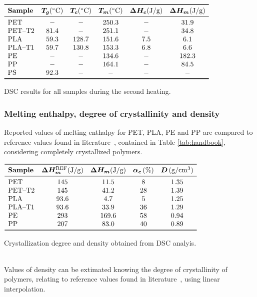 \documentclass[a4paper, 11pt]{article}
\begin{document}
\begin{table}[htp]
\centering
$
\begin{array}{lccccc}
\toprule
\textbf{Sample} & \bm{T_{g}} (\SI{}{\celsius}) & \bm{T_{c}} (\SI{}{\celsius}) & \bm{T_m} (\SI{}{\celsius}) & \bm{\Delta H_{c}} (\si{J/g}) & \bm{\Delta H_m} (\si{J/g}) \\
\midrule
\text{PET} & - & - & 250.3 & - & 31.9 \\
\text{PET–T2} & 81.4 & - & 251.1 & - & 34.8 \\
\text{PLA} & 59.3 & 128.7 & 151.6 & 7.5 & 6.1 \\
\text{PLA–T1} & 59.7 & 130.8 & 153.3 & 6.8 & 6.6 \\
\text{PE} & - & - & 134.6 & - & 182.3 \\
\text{PP} & - & - & 164.1 & - & 84.5 \\
\text{PS} & 92.3 & - & - & - & - \\
\bottomrule
\end{array}
$
\caption{DSC results for all samples during the second heating.}
\label{tab:dsc3}
\end{table}

\newpage

\subsubsection{Melting enthalpy, degree of crystallinity and density}

Reported values of melting enthalpy for PET, PLA, PE and PP are compared to reference values found in literature~\cite{handbook}, contained in Table \ref{tab:handbook}, considering completely crystallized polymers.
\begin{table}[htp]
\centering
$
\begin{array}{lcccc}
\toprule
\textbf{Sample} & \bm{\Delta H_m^\text{REF}} (\si{J/g})  & \bm{\Delta H_m} (\si{J/g})  & \bm{\alpha_c} \,(\%) & \bm{D}\, (\si{g/cm^3}) \\
\midrule
\text{PET} & 145 & 11.5 & 8 & 1.35 \\
\text{PET–T2} & 145 & 41.2 & 28 & 1.39 \\
\text{PLA} & 93.6 & 4.7 & 5 & 1.25\\
\text{PLA–T1} & 93.6 & 33.9 & 36 & 1.29\\
\text{PE} & 293 & 169.6 & 58 & 0.94\\
\text{PP} & 207 & 83.0 & 40 & 0.89 \\
\bottomrule
\end{array}
$
\caption{Crystallization degree and density obtained from DSC analyis.}
\label{tab:handbook}
\end{table}\\
Values of density can be extimated knowing the degree of crystallinity of polymers, relating to reference values found in literature~\cite{handbook}, using linear interpolation. 
\end{document}

